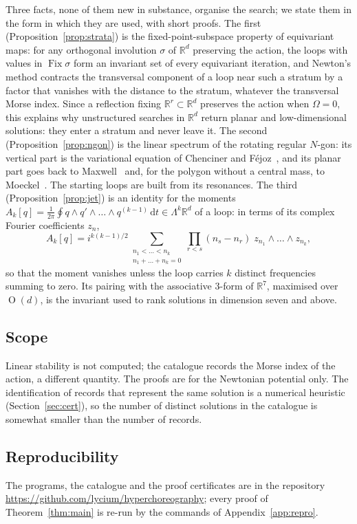 \documentclass[11pt]{amsart}
\theoremstyle{definition}
\newcommand{\R}{\mathbb{R}}
\newcommand{\dd}{\,\mathrm{d}}
\DeclareMathOperator{\Orth}{O}
\DeclareMathOperator{\Fix}{Fix}
\begin{document}
Three facts, none of them new in substance, organise the search; we state them in the form in which they are used, with short proofs. The first (Proposition~\ref{prop:strata}) is the fixed-point-subspace property of equivariant maps: for any orthogonal involution $\sigma$ of $\R^d$ preserving the action, the loops with values in $\Fix\sigma$ form an invariant set of every equivariant iteration, and Newton's method contracts the transversal component of a loop near such a stratum by a factor that vanishes with the distance to the stratum, whatever the transversal Morse index. Since a reflection fixing $\R^r\subset\R^d$ preserves the action when $\Omega=0$, this explains why unstructured searches in $\R^d$ return planar and low-dimensional solutions: they enter a stratum and never leave it. The second (Proposition~\ref{prop:ngon}) is the linear spectrum of the rotating regular $N$-gon: its vertical part is the variational equation of Chenciner and F\'ejoz~\cite{ChencinerFejoz2005}, and its planar part goes back to Maxwell~\cite{Maxwell1859} and, for the polygon without a central mass, to Moeckel~\cite{Moeckel1995}. The starting loops are built from its resonances. The third (Proposition~\ref{prop:jet}) is an identity for the moments $A_k[q]=\frac1{2\pi}\oint q\wedge q'\wedge\dots\wedge q^{(k-1)}\dd t\in\Lambda^k\R^d$ of a loop: in terms of its complex Fourier coefficients $z_n$,
\[
A_k[q]=i^{k(k-1)/2}\sum_{\substack{n_1<\dots<n_k\\ n_1+\dots+n_k=0}}\prod_{r<s}(n_s-n_r)\; z_{n_1}\wedge\dots\wedge z_{n_k},
\]
so that the moment vanishes unless the loop carries $k$ distinct frequencies summing to zero. Its pairing with the associative $3$-form of $\R^7$, maximised over $\Orth(d)$, is the invariant used to rank solutions in dimension seven and above.

\subsection*{Scope}
Linear stability is not computed; the catalogue records the Morse index of the action, a different quantity. The proofs are for the Newtonian potential only. The identification of records that represent the same solution is a numerical heuristic (Section~\ref{sec:cert}), so the number of distinct solutions in the catalogue is somewhat smaller than the number of records.

\subsection*{Reproducibility}
The programs, the catalogue and the proof certificates are in the repository \url{https://github.com/lycium/hyperchoreography}; every proof of Theorem~\ref{thm:main} is re-run by the commands of Appendix~\ref{app:repro}.
\end{document}
